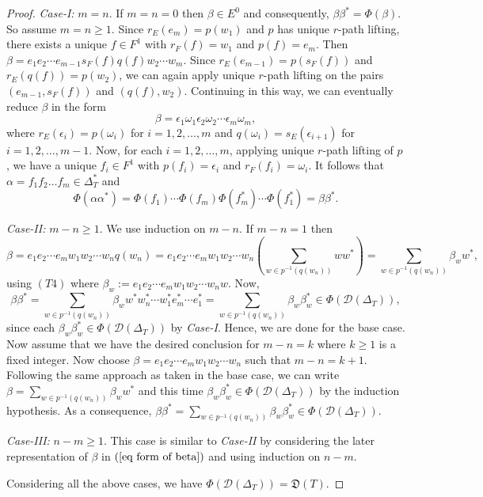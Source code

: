\documentclass[a4paper,reqno,12pt]{amsart}
\theoremstyle{definition}
\theoremstyle{remark}
\begin{document}
\begin{proof}
\emph{Case-I:} $m=n$. If $m=n=0$ then $\beta\in E^0$ and consequently, $\beta\beta^*=\Phi(\beta)$. So assume $m=n\ge 1$. Since $r_E(e_m)=p(w_1)$ and $p$ has unique $r$-path lifting, there exists a unique $f\in F^1$ with $r_F(f)=w_1$ and $p(f)=e_m$. Then $\beta=e_1e_2\cdots e_{m-1}s_F(f)q(f)w_2\cdots w_m$. Since $r_E(e_{m-1})=p(s_F(f))$ and $r_E(q(f))=p(w_2)$, we can again apply unique $r$-path lifting on the pairs $(e_{m-1},s_F(f))$ and $(q(f),w_2)$. Continuing in this way, we can eventually reduce $\beta$ in the form \[\beta=\epsilon_1 \omega_1 \epsilon_2 \omega_2\cdots \epsilon_m \omega_m,\] where $r_E(\epsilon_i)=p(\omega_i)$ for $i=1,2,\ldots, m$ and $q(\omega_i)=s_E(\epsilon_{i+1})$ for $i=1,2,\ldots,m-1$. Now, for each $i=1,2,\ldots,m$, applying unique $r$-path lifting of $p$, we have a unique $f_i\in F^1$ with $p(f_i)=\epsilon_i$ and $r_F(f_i)=\omega_i$. It follows that $\alpha=f_1f_2\ldots f_m\in \Delta_T^*$ and \[\Phi(\alpha\alpha^*)=\Phi(f_1)\cdots \Phi(f_m)\Phi(f_m^*)\cdots \Phi(f_1^*)=\beta\beta^*.\]

\emph{Case-II:} $m-n\ge 1$. We use induction on $m-n$. If $m-n=1$ then \[\beta=e_1 e_2\cdots e_m w_1 w_2 \cdots w_n q(w_n)=e_1 e_2\cdots e_m w_1 w_2 \cdots w_n \left(\displaystyle{\sum_{w\in p^{-1}(q(w_n))}} ww^*\right)=\displaystyle{\sum_{w\in p^{-1}(q(w_n))}} \beta_w w^*,\] using $(T4)$ where $\beta_w:=e_1 e_2 \cdots e_m w_1 w_2 \cdots w_n w$. Now, \[\beta \beta^*=\displaystyle{\sum_{w\in p^{-1}(q(w_n))}} \beta_w w^* w_n^*\cdots w_1^* e_m^* \cdots e_1^*=\displaystyle{\sum_{w\in p^{-1}(q(w_n))}} \beta_w \beta_w^*\in \Phi(\mathcal{D}(\Delta_T)),\] since each $\beta_w \beta_w^*\in \Phi(\mathcal{D}(\Delta_T))$ by \emph{Case-I}. Hence, we are done for the base case. Now assume that we have the desired conclusion for $m-n=k$ where $k\ge 1$ is a fixed integer. Now choose $\beta=e_1e_2\cdots e_m w_1 w_2\cdots w_n$ such that $m-n=k+1$. Following the same approach as taken in the base case, we can write $\beta=\displaystyle{\sum_{w\in p^{-1}(q(w_n))}} \beta_w w^*$ and this time $\beta_w \beta_w^*\in \Phi(\mathcal{D}(\Delta_T))$ by the induction hypothesis. As a consequence, $\beta\beta^*=\displaystyle{\sum_{w\in p^{-1}(q(w_n))}} \beta_w \beta_w^*\in \Phi(\mathcal{D}(\Delta_T))$. 

\emph{Case-III:} $n-m\ge 1$. This case is similar to \emph{Case-II} by considering the later representation of $\beta$ in $(\ref{eq form of beta})$ and using induction on $n-m$. 

Considering all the above cases, we have $\Phi(\mathcal{D}(\Delta_T))=\mathfrak{D}(T)$. 
\end{proof}
\end{document}
